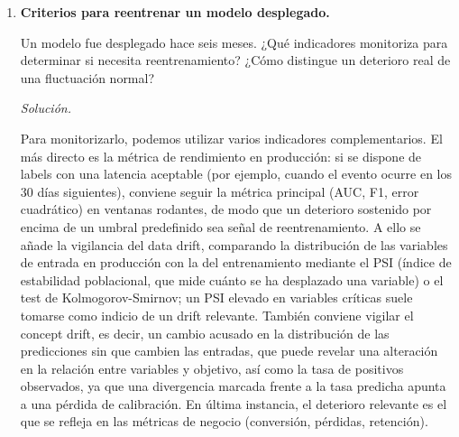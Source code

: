 \documentclass[12pt]{article}
\newcommand\sol[1]{\begin{mdframed}
\emph{Solución.} #1
\end{mdframed}}
\begin{document}
\begin{enumerate}
{\begin{enumerate}[1.]
  \item Señal débil en datos tabulares de alta dimensión y mucho ruido. Las redes neuronales pueden
  amplificar el ruido cuando la relación señal-ruido es baja, porque aprenden con facilidad patrones
  espurios. Los modelos con regularización explícita (Lasso, Ridge, o árboles con la profundidad y el
  tamaño de hoja limitados) son más conservadores y suelen generalizar mejor en estos contextos.

  \item Problemas con variables muy interpretables y efectos aditivos conocidos. Si el conocimiento de
  dominio indica que la relación entre las variables y el objetivo es aproximadamente lineal o
  log-lineal, una regresión logística o una regresión lineal regularizada es más eficiente, más
  interpretable y menos propensa al sobreajuste que una red neuronal que dedicaría capacidad a modelar
  no linealidades inexistentes.
\end{enumerate}
}

\item \textbf{Criterios para reentrenar un modelo desplegado.}

Un modelo fue desplegado hace seis meses. ¿Qué indicadores monitoriza para determinar si necesita
reentrenamiento? ¿Cómo distingue un deterioro real de una fluctuación normal?

\sol{

Para monitorizarlo, podemos utilizar varios indicadores complementarios. El más directo es la métrica de
rendimiento en producción: si se dispone de labels con una latencia aceptable (por ejemplo,
cuando el evento ocurre en los 30 días siguientes), conviene seguir la métrica principal (AUC, F1,
error cuadrático) en ventanas rodantes, de modo que un deterioro sostenido por encima de un umbral
predefinido sea señal de reentrenamiento. A ello se añade la vigilancia del data drift, comparando la
distribución de las variables de entrada en producción con la del entrenamiento mediante el PSI
(índice de estabilidad poblacional, que mide cuánto se ha desplazado una variable) o el test de
Kolmogorov-Smirnov; un PSI elevado en variables críticas suele tomarse como indicio de un drift
relevante. También conviene vigilar el concept drift, es decir, un cambio acusado en la distribución
de las predicciones sin que cambien las entradas, que puede revelar una alteración en la relación
entre variables y objetivo, así como la tasa de positivos observados, ya que una divergencia marcada
frente a la tasa predicha apunta a una pérdida de calibración. En última instancia, el deterioro
relevante es el que se refleja en las métricas de negocio (conversión, pérdidas, retención).

}
\end{enumerate}
\end{document}
